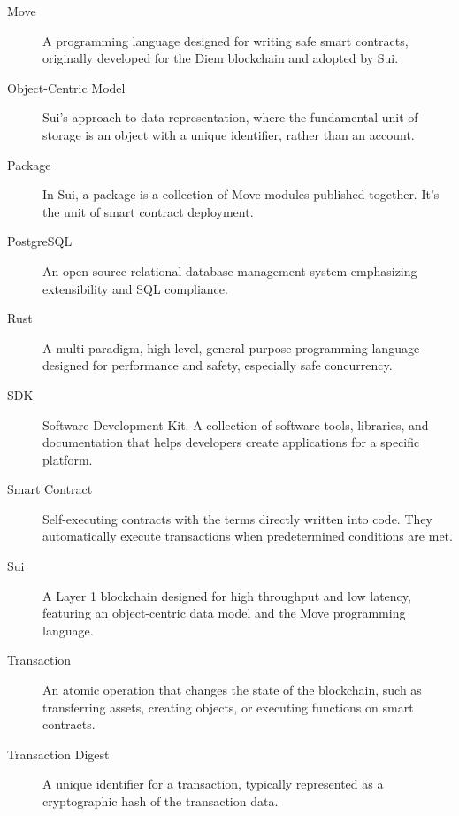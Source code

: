 \begin{description}
    \item[Move] A programming language designed for writing safe smart contracts, originally developed for the Diem blockchain and adopted by Sui.
    
    \item[Object-Centric Model] Sui's approach to data representation, where the fundamental unit of storage is an object with a unique identifier, rather than an account.
    
    \item[Package] In Sui, a package is a collection of Move modules published together. It's the unit of smart contract deployment.
    
    \item[PostgreSQL] An open-source relational database management system emphasizing extensibility and SQL compliance.
    
    \item[Rust] A multi-paradigm, high-level, general-purpose programming language designed for performance and safety, especially safe concurrency.
    
    \item[SDK] Software Development Kit. A collection of software tools, libraries, and documentation that helps developers create applications for a specific platform.
    
    \item[Smart Contract] Self-executing contracts with the terms directly written into code. They automatically execute transactions when predetermined conditions are met.
    
    \item[Sui] A Layer 1 blockchain designed for high throughput and low latency, featuring an object-centric data model and the Move programming language.
    
    \item[Transaction] An atomic operation that changes the state of the blockchain, such as transferring assets, creating objects, or executing functions on smart contracts.
    
    \item[Transaction Digest] A unique identifier for a transaction, typically represented as a cryptographic hash of the transaction data.
\end{description} 